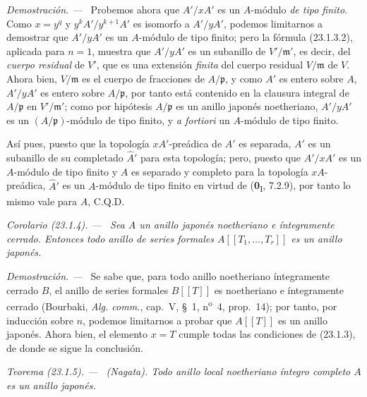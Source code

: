 \documentclass[10pt,oneside]{book}
\makeatletter
\newcommand{\setmanualcurrentlabel}[1]{\def\@currentlabel{#1}}
\newenvironment{theorem}[1][]{%
  \setmanualcurrentlabel{#1}\par\medskip\noindent\itshape Teorema (#1). ---\ }{\par}
\newenvironment{corollary}[1][]{%
  \setmanualcurrentlabel{#1}\par\medskip\noindent\itshape Corolario (#1). ---\ }{\par}
\newenvironment{proof}{%
  \par\medskip\noindent\textit{Demostración. ---\ }}{\par}
\makeatother
\begin{document}
\begin{proof}
Probemos ahora que $A'/xA'$ es un $A$-módulo \emph{de tipo finito}. Como $x=y^q$
y $y^kA'/y^{k+1}A'$ es isomorfo a $A'/yA'$, podemos limitarnos a
demostrar que $A'/yA'$ es un $A$-módulo de tipo finito; pero la fórmula
(23.1.3.2), aplicada para $n=1$, muestra que $A'/yA'$ es un subanillo de
$V'/\mathfrak m'$, es decir, del \emph{cuerpo residual} de $V'$, que es una
extensión \emph{finita} del cuerpo residual $V/\mathfrak m$ de $V$. Ahora bien,
$V/\mathfrak m$ es el cuerpo de fracciones de $A/\mathfrak p$, y como
$A'$ es entero sobre $A$, $A'/yA'$ es entero sobre $A/\mathfrak p$, por tanto
está contenido en la clausura integral de $A/\mathfrak p$ en
$V'/\mathfrak m'$; como por hipótesis $A/\mathfrak p$ es un anillo
japonés noetheriano, $A'/yA'$ es un $(A/\mathfrak p)$-módulo de tipo finito,
y \emph{a fortiori} un $A$-módulo de tipo finito.

Así pues, puesto que la topología $xA'$-preádica de $A'$ es separada, $A'$ es un
subanillo de su completado $\widehat A'$ para esta topología; pero, puesto que
$A'/xA'$ es un $A$-módulo de tipo finito y $A$ es separado y completo para
la topología $xA$-preádica, $\widehat A'$ es un $A$-módulo de tipo finito en
virtud de (\textbf{0}\textsubscript{I}, 7.2.9), por tanto lo mismo vale para $A$, C.Q.D.
\end{proof}

\begin{corollary}[23.1.4]
\label{0.23.1.4-es}
Sea $A$ un anillo japonés noetheriano e íntegramente cerrado. Entonces todo
anillo de series formales $A[[T_1,\ldots,T_r]]$ es un anillo japonés.
\end{corollary}

\begin{proof}
Se sabe que, para todo anillo noetheriano íntegramente cerrado $B$, el anillo de
series formales $B[[T]]$ es noetheriano e íntegramente cerrado (Bourbaki,
\emph{Alg. comm.}, cap.~V, §~1, n\textsuperscript{o}~4, prop.~14); por
tanto, por inducción sobre $n$, podemos limitarnos a probar que $A[[T]]$ es un anillo
japonés. Ahora bien, el elemento $x=T$ cumple todas las condiciones de (23.1.3), de donde
se sigue la conclusión.
\end{proof}

\begin{theorem}[23.1.5]
\label{0.23.1.5-es}
\textnormal{(Nagata).} Todo anillo local noetheriano íntegro \textup{completo} $A$ es
un anillo japonés.
\end{theorem}
\end{document}

